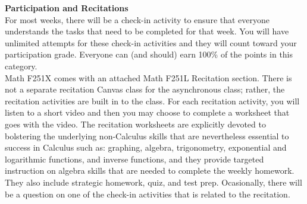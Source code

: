 \documentclass[12pt]{article}
\renewcommand{\emph}[1]{\textsf{\textbf{#1}}}
\newcommand{\localhead}[1]{\par\smallskip\textbf{#1}\nobreak\\}%
\def\heading#1{\localhead{\large\emph{#1}}}
\newenvironment{clist}%
{\bgroup\parskip 0pt\begin{list}{$\bullet$}{\partopsep 4pt\topsep 0pt\itemsep -2pt}}%
{\end{list}\egroup}%
\begin{document}
%

\heading{Participation and Recitations}
For most weeks, there will be a check-in activity to ensure that everyone understands the tasks that need to be completed for that week. You will have unlimited attempts for these check-in activities and they will count toward your participation grade. Everyone can (and should) earn 100\% of the points in this category.\\

Math F251X comes with an attached Math F251L Recitation section. There is not a separate recitation Canvas class for the asynchronous class; rather, the recitation activities are built in to the class. For each recitation activity, you will listen to a short video and then you may choose to complete a worksheet that goes with the video. The recitation worksheets are explicitly devoted to bolstering the underlying non-Calculus skills that are nevertheless essential to success in Calculus such as: graphing, algebra, trigonometry, exponential and logarithmic functions, and inverse functions, and they provide targeted instruction on algebra skills that are needed to complete the weekly homework. They also include strategic homework, quiz, and test prep. Ocasionally, there will be a question on one of the check-in activities that is related to the recitation.\\
\end{document}
